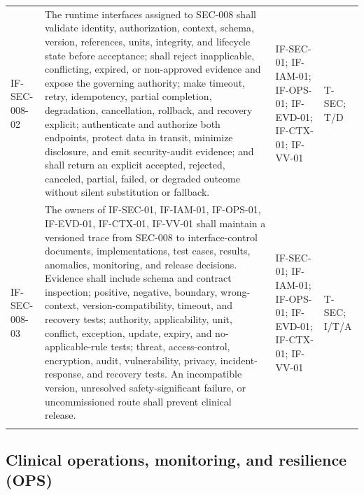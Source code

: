 \documentclass[11pt,letterpaper]{article}
\begin{document}
\begin{scriptsize}
\begin{longtable}{@{}L{0.14\textwidth}L{0.49\textwidth}L{0.19\textwidth}L{0.10\textwidth}@{}}
\addlinespace[2pt]
\mbox{IF-SEC-008-02} & The runtime interfaces assigned to SEC-008 shall validate identity, authorization, context, schema, version, references, units, integrity, and lifecycle state before acceptance; shall reject inapplicable, conflicting, expired, or non-approved evidence and expose the governing authority; make timeout, retry, idempotency, partial completion, degradation, cancellation, rollback, and recovery explicit; authenticate and authorize both endpoints, protect data in transit, minimize disclosure, and emit security-audit evidence; and shall return an explicit accepted, rejected, canceled, partial, failed, or degraded outcome without silent substitution or fallback. & IF-SEC-01; IF-IAM-01; IF-OPS-01; IF-EVD-01; IF-CTX-01; IF-VV-01 & T-SEC; T\slash\allowbreak{}D \\
\addlinespace[2pt]
\mbox{IF-SEC-008-03} & The owners of IF-SEC-01, IF-IAM-01, IF-OPS-01, IF-EVD-01, IF-CTX-01, IF-VV-01 shall maintain a versioned trace from SEC-008 to interface-control documents, implementations, test cases, results, anomalies, monitoring, and release decisions. Evidence shall include schema and contract inspection; positive, negative, boundary, wrong-context, version-compatibility, timeout, and recovery tests; authority, applicability, unit, conflict, exception, update, expiry, and no-applicable-rule tests; threat, access-control, encryption, audit, vulnerability, privacy, incident-response, and recovery tests. An incompatible version, unresolved safety-significant failure, or uncommissioned route shall prevent clinical release. & IF-SEC-01; IF-IAM-01; IF-OPS-01; IF-EVD-01; IF-CTX-01; IF-VV-01 & T-SEC; I\slash\allowbreak{}T\slash\allowbreak{}A \\
\addlinespace[2pt]
\end{longtable}
\end{scriptsize}

\subsection{Clinical operations, monitoring, and resilience (OPS)}
\end{document}
